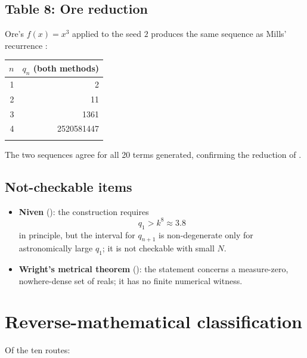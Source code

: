 \documentclass[11pt,reqno]{amsart}
\theoremstyle{redplain}
\numberwithin{equation}{section}
\begin{document}
\subsection{Table 8: Ore reduction}

Ore's $f(x)=x^3$ applied to the seed $2$ produces the same sequence as
Mills' recurrence :

\begin{center}
\begin{tabular}{rr}
\toprule $n$ & $q_n$ (both methods) \\ 
\midrule 1 & 2 \\ 
2 & 11 \\ 
3 & 1361 \\ 
4 & 2520581447 \\ 
\bottomrule & 
\end{tabular}
\end{center}

The two sequences agree for all 20 terms generated, confirming the reduction
of .

\subsection{Not-checkable items}

\begin{itemize}
\item \textbf{Niven} (): the construction requires 
\begin{equation}
q_{1}>k^{8}\approx 3.8
\end{equation}
in principle, but the interval for $q_{n+1}$ is non-degenerate only for
astronomically large $q_{1}$; it is not checkable with small $N$.

\item \textbf{Wright's metrical theorem} (): the
statement concerns a measure-zero, nowhere-dense set of reals; it has no
finite numerical witness.
\end{itemize}


\section{Reverse-mathematical classification}

\label{sec:summary}

\noindent Of the ten routes:
\end{document}
